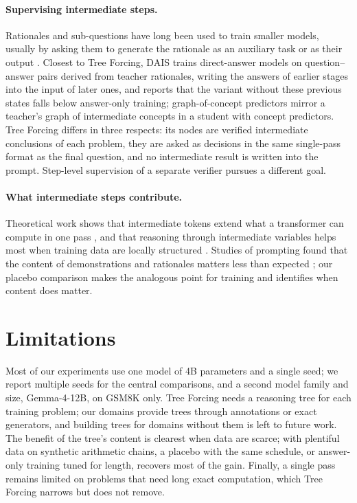 \documentclass{article}
\newcommand{\tf}{Tree Forcing}
\begin{document}
\paragraph{Supervising intermediate steps.} Rationales and sub-questions have long been used to train smaller
models, usually by asking them to generate the rationale as an auxiliary task \citep{hsieh2023dss,li2022explanations}
or as their output \citep{ho2023teachers,shridhar2023socratic,zelikman2022star}. Closest to \tf{}, DAIS
\citep{dais2026} trains direct-answer models on question--answer pairs derived from teacher rationales, writing the
answers of earlier stages into the input of later ones, and reports that the variant without these previous states
falls below answer-only training; graph-of-concept predictors \citep{gcp2026} mirror a teacher's graph of
intermediate concepts in a student with concept predictors. \tf{} differs in three respects: its nodes are verified intermediate conclusions of each problem, they are asked
as decisions in the same single-pass format as the final question, and no intermediate result is written into the
prompt. Step-level supervision of a separate verifier \citep{lightman2023verify} pursues a different goal.

\paragraph{What intermediate steps contribute.} Theoretical work shows that intermediate tokens extend what a
transformer can compute in one pass \citep{feng2023mystery,merrill2024expressive}, and that reasoning through
intermediate variables helps most when training data are locally structured \citep{prystawski2023why}. Studies of
prompting found that the content of demonstrations and rationales matters less than expected
\citep{min2022rethinking,wang2023understanding}; our placebo comparison makes the analogous point for training and
identifies when content does matter.

\section{Limitations}
\label{sec:limitations}

Most of our experiments use one model of 4B parameters and a single seed; we report multiple seeds for the central
comparisons, and a second model family and size, Gemma-4-12B, on GSM8K only. \tf{} needs a reasoning tree for each
training problem; our domains provide trees through annotations or exact generators, and building trees for
domains without them is left to future work. The benefit of the tree's content is clearest when
data are scarce; with plentiful data on synthetic arithmetic chains, a placebo with the same schedule, or answer-only
training tuned for length, recovers most of the gain. Finally, a single pass remains limited on problems that need
long exact computation, which \tf{} narrows but does not remove.
\end{document}
